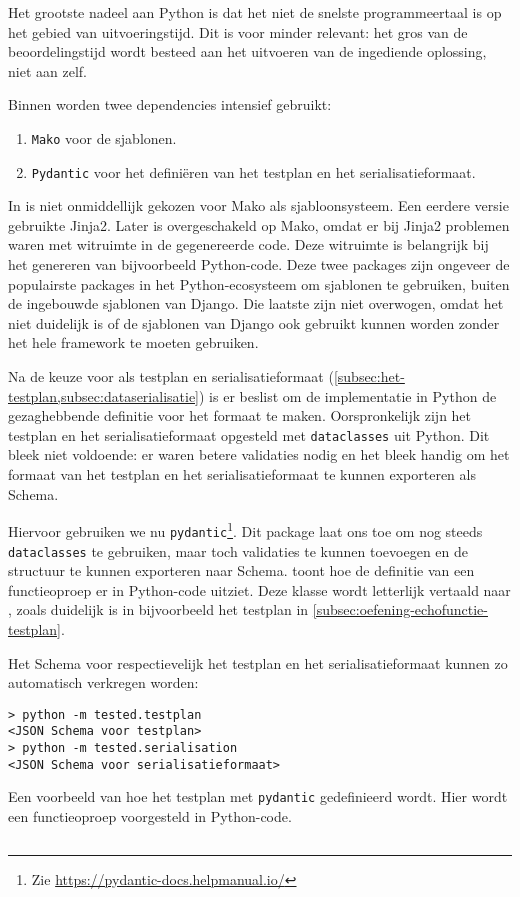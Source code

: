 Het grootste nadeel aan Python is dat het niet de snelste programmeertaal is op het gebied van uitvoeringstijd.
Dit is voor \tested{} minder relevant: het gros van de beoordelingstijd wordt besteed aan het uitvoeren van de ingediende oplossing, niet aan \tested{} zelf.

Binnen \tested{} worden twee dependencies intensief gebruikt:

\begin{enumerate}
    \item \texttt{Mako} voor de sjablonen.
    \item \texttt{Pydantic} voor het definiëren van het testplan en het serialisatieformaat.
\end{enumerate}

In \tested{} is niet onmiddellijk gekozen voor Mako als sjabloonsysteem.
Een eerdere versie gebruikte Jinja2.
Later is overgeschakeld op Mako, omdat er bij Jinja2 problemen waren met witruimte in de gegenereerde code.
Deze witruimte is belangrijk bij het genereren van bijvoorbeeld Python-code.
Deze twee packages zijn ongeveer de populairste packages in het Python-ecosysteem om sjablonen te gebruiken, buiten de ingebouwde sjablonen van Django.
Die laatste zijn niet overwogen, omdat het niet duidelijk is of de sjablonen van Django ook gebruikt kunnen worden zonder het hele framework te moeten gebruiken.

Na de keuze voor  als testplan en serialisatieformaat (\cref{subsec:het-testplan,subsec:dataserialisatie}) is er beslist om de implementatie in Python de gezaghebbende definitie voor het formaat te maken.
Oorspronkelijk zijn het testplan en het serialisatieformaat opgesteld met \texttt{dataclasses} uit Python.
Dit bleek niet voldoende: er waren betere validaties nodig en het bleek handig om het formaat van het testplan en het serialisatieformaat te kunnen exporteren als  Schema.

Hiervoor gebruiken we nu \texttt{pydantic}\footnote{Zie \url{https://pydantic-docs.helpmanual.io/}}.
Dit package laat ons toe om nog steeds \texttt{dataclasses} te gebruiken, maar toch validaties te kunnen toevoegen en de structuur te kunnen exporteren naar  Schema.
 toont hoe de definitie van een functieoproep er in Python-code uitziet.
Deze klasse wordt letterlijk vertaald naar , zoals duidelijk is in bijvoorbeeld het testplan in \cref{subsec:oefening-echofunctie-testplan}.

Het  Schema voor respectievelijk het testplan en het serialisatieformaat kunnen zo automatisch verkregen worden:

\begin{verbatim}
> python -m tested.testplan
<JSON Schema voor testplan>
> python -m tested.serialisation
<JSON Schema voor serialisatieformaat>
\end{verbatim}

\begin{listing}
    \caption{
        Een voorbeeld van hoe het testplan met \texttt{pydantic} gedefinieerd wordt.
        Hier wordt een functieoproep voorgesteld in Python-code.
    }
    \label{lst:function-python}
    \inputminted{python}{code/function-testplan.py}
\end{listing}
